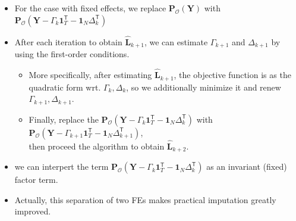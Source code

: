 \documentclass[xcolor=svgnames,aspectratio=169]{beamer}
\begin{document}
\begin{frame}
    \begin{itemize}
        \item For the case with fixed effects, we replace $\mathbf{P}_{\mathcal{O} }(\mathbf{Y})$ with $\mathbf{P_{\mathcal{O} }}({\mathbf{Y}-\Gamma_k}\mathbf{1}_T^{\mathsf{T}}-\mathbf{1}_N\Delta_k^{\mathsf{T}})$
        \item After each iteration to obtain $\hat{\mathbf{L}}_{k+1}$, we can estimate $\Gamma_{k+1}$ and $\Delta_{k+1}$ by using the first-order conditions.
        \begin{itemize}
            \item More specifically, after estimating $\hat{\mathbf{L}}_{k+1}$, the objective function is as the quadratic form wrt. $\Gamma_k, \Delta_k$, so we additionally minimize it and renew $\Gamma_{k+1}, \Delta_{k+1}$.
            \item Finally, replace the $\mathbf{P_{\mathcal{O} }}({\mathbf{Y}-\Gamma_k}\mathbf{1}_T^{\mathsf{T}}-\mathbf{1}_N\Delta_k^{\mathsf{T}})$ with $\mathbf{P_{\mathcal{O} }}({\mathbf{Y}-\Gamma_{k+1}}\mathbf{1}_T^{\mathsf{T}}-\mathbf{1}_N\Delta_{k+1}^{\mathsf{T}})$, \\ then proceed the algorithm to obtain $\hat{\mathbf{L}}_{k+2}$.
        \end{itemize}
        \item we can interpert the term $\mathbf{P_{\mathcal{O} }}({\mathbf{Y}-\Gamma_k}\mathbf{1}_T^{\mathsf{T}}-\mathbf{1}_N\Delta_k^{\mathsf{T}})$ as an \alert{invariant (fixed)} factor term.
        \item Actually, this separation of two FEs makes practical imputation greatly improved.
    \end{itemize}
\end{frame}
\end{document}
